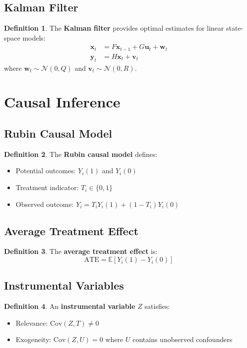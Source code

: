 \documentclass[11pt]{article}
\theoremstyle{definition}
\newtheorem{definition}{Definition}[section]
\begin{document}
\subsection{Kalman Filter}
\begin{definition}
The \textbf{Kalman filter} provides optimal estimates for linear state-space models:
\begin{align}
\mathbf{x}_t &= F \mathbf{x}_{t-1} + G \mathbf{u}_t + \mathbf{w}_t \\
\mathbf{y}_t &= H \mathbf{x}_t + \mathbf{v}_t
\end{align}
where $\mathbf{w}_t \sim \mathcal{N}(0, Q)$ and $\mathbf{v}_t \sim \mathcal{N}(0, R)$.
\end{definition}

\section{Causal Inference}

\subsection{Rubin Causal Model}
\begin{definition}
The \textbf{Rubin causal model} defines:
\begin{itemize}
    \item Potential outcomes: $Y_i(1)$ and $Y_i(0)$
    \item Treatment indicator: $T_i \in \{0, 1\}$
    \item Observed outcome: $Y_i = T_i Y_i(1) + (1-T_i) Y_i(0)$
\end{itemize}
\end{definition}

\subsection{Average Treatment Effect}
\begin{definition}
The \textbf{average treatment effect} is:
$$\text{ATE} = \mathbb{E}[Y_i(1) - Y_i(0)]$$
\end{definition}

\subsection{Instrumental Variables}
\begin{definition}
An \textbf{instrumental variable} $Z$ satisfies:
\begin{itemize}
    \item Relevance: $\text{Cov}(Z, T) \neq 0$
    \item Exogeneity: $\text{Cov}(Z, U) = 0$ where $U$ contains unobserved confounders
\end{itemize}
\end{definition}
\end{document}
